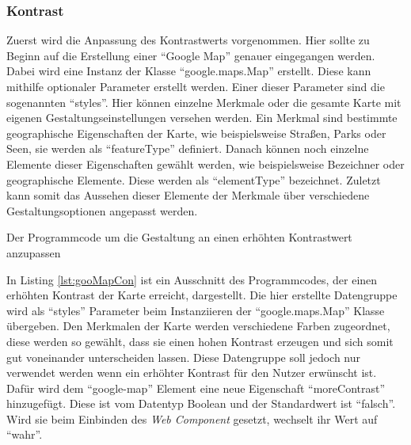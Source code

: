 \documentclass[12pt, paper=a4, bibtotoc, toc=listof, headsepline=true]{scrreprt}
\begin{document}
			\subsubsection{Kontrast}
			Zuerst wird die Anpassung des Kontrastwerts vorgenommen. Hier sollte zu Beginn auf die Erstellung einer \enquote{Google Map} genauer eingegangen werden. Dabei wird eine Instanz der Klasse \enquote{google.maps.Map} erstellt. Diese kann mithilfe optionaler Parameter erstellt werden. Einer dieser Parameter sind die sogenannten \enquote{styles}. Hier können einzelne Merkmale oder die gesamte Karte mit eigenen Gestaltungseinstellungen versehen werden. Ein Merkmal sind bestimmte geographische Eigenschaften der Karte, wie beispielsweise Straßen, Parks oder Seen, sie werden als \enquote{featureType} definiert. Danach können noch einzelne Elemente dieser Eigenschaften gewählt werden, wie beispielsweise Bezeichner oder geographische Elemente. Diese werden als \enquote{elementType} bezeichnet. Zuletzt kann somit das Aussehen dieser Elemente der Merkmale über verschiedene Gestaltungsoptionen angepasst werden.\cite[vgl.]{gmapStyle}
					\begin{listing}
				\caption{Der Programmcode um die Gestaltung an einen erhöhten Kontrastwert anzupassen}
				\label{lst:gooMapCon}
			\end{listing}
		In Listing \ref{lst:gooMapCon} ist ein Ausschnitt des Programmcodes, der einen erhöhten Kontrast der Karte erreicht, dargestellt. Die hier erstellte Datengruppe wird als \enquote{styles} Parameter beim Instanziieren der \enquote{google.maps.Map} Klasse übergeben. Den Merkmalen der Karte werden verschiedene Farben zugeordnet, diese werden so gewählt, dass sie einen hohen Kontrast erzeugen und sich somit gut voneinander unterscheiden lassen. Diese Datengruppe soll jedoch nur verwendet werden wenn ein erhöhter Kontrast für den Nutzer erwünscht ist. Dafür wird dem \enquote{google-map} Element eine neue Eigenschaft \enquote{moreContrast} hinzugefügt. Diese ist vom Datentyp Boolean und der Standardwert ist \enquote{falsch}. Wird sie beim Einbinden des \emph{Web Component} gesetzt, wechselt ihr Wert auf \enquote{wahr}. 
\end{document}
